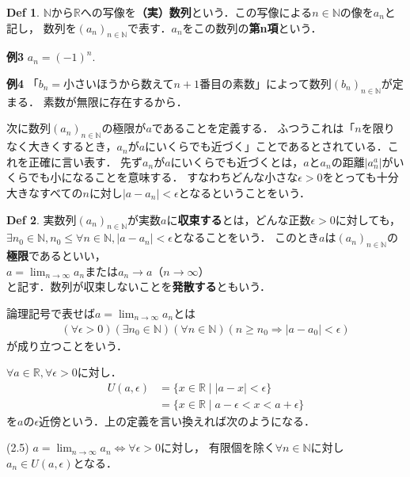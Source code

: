 \documentclass{ltjsarticle}
\theoremstyle{definition}
\newtheorem{definition}{Def}[subsection]
\theoremstyle{propcorollarystyle}
\theoremstyle{thmcorollarystyle}
\begin{document}
\begin{definition}
  $\mathbb{N}\text{から}\mathbb{R}$への写像を\textbf{（実）数列}という．この写像による$n \in \mathbb{N}$の像を$a_n$と記し，
  数列を$(a_n)_{n \in \mathbb{N}}$で表す．$a_n$をこの数列の\textbf{第n項}という．
\end{definition}

\textbf{例3} $a_n=(-1)^n.$

\textbf{例4} 「$b_n=$小さいほうから数えて$n+1$番目の素数」によって数列$(b_n)_{n \in \mathbb{N}}$が定まる．
素数が無限に存在するから．

次に数列$(a_n)_{n \in \mathbb{N}}$の極限が$a$であることを定義する．
ふつうこれは「$n$を限りなく大きくするとき，$a_n$が$a$にいくらでも近づく」ことであるとされている．これを正確に言い表す．
先ず$a_n$が$a$にいくらでも近づくとは，$a$と$a_n$の距離$|a^a_n|$がいくらでも小になることを意味する．
すなわちどんな小さな$\epsilon > 0$をとっても十分大きなすべての$n$に対し$|a-a_n|<\epsilon$となるということをいう．

\begin{definition}
  実数列$(a_n)_{n \in \mathbb{N}}$が実数$a$に\textbf{収束する}とは，どんな正数$\epsilon > 0$に対しても，
  $\exists n_0 \in \mathbb{N},n_0 \le \forall n \in \mathbb{N},|a-a_n|<\epsilon$となることをいう．
  このとき$a$は$(a_n)_{n \in \mathbb{N}}$の\textbf{極限}であるといい，\\
  $a=\lim_{n \to \infty} a_n \text{または} a_n \rightarrow a（n\rightarrow \infty）$\\
  と記す．数列が収束しないことを\textbf{発散する}ともいう．
\end{definition}

論理記号で表せば$a=\lim_{n \rightarrow \infty} a_n$とは\\
\begin{align*}
  (\forall \epsilon >0)(\exists n_0 \in \mathbb{N})(\forall n \in \mathbb{N})(n \ge n_0 \Rightarrow |a-a_0|<\epsilon)
\end{align*}
が成り立つことをいう．

$\forall a \in \mathbb{R},\forall \epsilon >0$に対し．
\begin{align*}
  U(a,\epsilon) &= \{x \in \mathbb{R} \mid |a-x|<\epsilon\}\\
  &=\{x \in \mathbb{R} \mid a-\epsilon <x<a+\epsilon\}
\end{align*}
を$a$の$\epsilon\textbf{近傍}$という．上の定義を言い換えれば次のようになる．

 (2.5) $a=\lim_{n \rightarrow \infty} a_n \iff  \forall \epsilon > 0$に対し，
有限個を除く$\forall n \in \mathbb{N}$に対し$a_n \in U(a,\epsilon)$となる．
\end{document}
